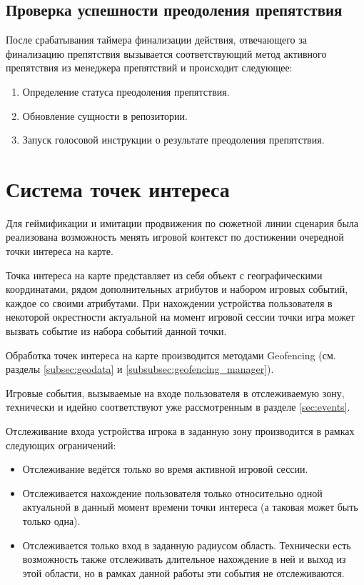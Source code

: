 \subsection*{Проверка успешности преодоления препятствия}
После срабатывания таймера финализации действия, отвечающего за финализацию препятствия вызывается соответствующий метод активного препятствия из менеджера препятствий и происходит следующее:
\begin{enumerate}
	\item Определение статуса преодоления препятствия.
	\item Обновление сущности в репозитории.
	\item Запуск голосовой инструкции о результате преодоления препятствия.
\end{enumerate}

\section{Система точек интереса}
\label{sec:geofencing}
Для геймификации и имитации продвижения по сюжетной линии сценария была реализована возможность менять игровой контекст по достижении очередной точки интереса на карте.

Точка интереса на карте представляет из себя объект с географическими координатами, рядом дополнительных атрибутов и набором игровых событий, каждое со своими атрибутами. При нахождении устройства пользователя в некоторой окрестности актуальной на момент игровой сессии точки игра может вызвать событие из набора событий данной точки.

Обработка точек интереса на карте производится методами Geofencing (см. разделы \ref{subsec:geodata} и \ref{subsubsec:geofencing_manager}).

Игровые события, вызываемые на входе пользователя в отслеживаемую зону, технически и идейно соответствуют уже рассмотренным в разделе \ref{sec:events}.

Отслеживание входа устройства игрока в заданную зону производится в рамках следующих ограничений:
\begin{itemize}
	\item Отслеживание ведётся только во время активной игровой сессии.
	\item Отслеживается нахождение пользователя только относительно одной актуальной в данный момент времени точки интереса (а таковая может быть только одна).
	\item Отслеживается только вход в заданную радиусом область. Технически есть возможность также отслеживать длительное нахождение в ней и выход из этой области, но в рамках данной работы эти события не отслеживаются.
\end{itemize}